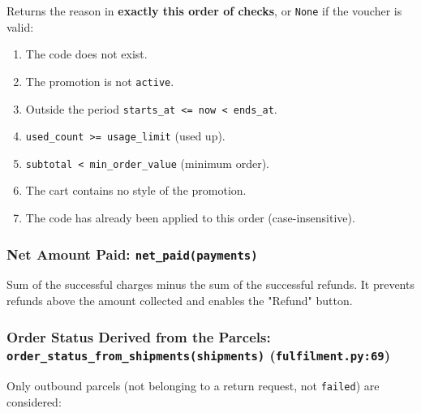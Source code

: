 Returns the reason in \textbf{exactly this order of checks}, or
\texttt{None} if the voucher is valid:

\begin{enumerate}
\def\labelenumi{\arabic{enumi}.}
\tightlist
\item
  The code does not exist.
\item
  The promotion is not \texttt{active}.
\item
  Outside the period
  \texttt{starts\_\allowbreak{}at \textless{}=\allowbreak{} now \textless{} ends\_\allowbreak{}at}.
\item
  \texttt{used\_\allowbreak{}count \textgreater{}\allowbreak{}=\allowbreak{} usage\_\allowbreak{}limit} (used up).
\item
  \texttt{subtotal \textless{} min\_\allowbreak{}order\_\allowbreak{}value} (minimum order).
\item
  The cart contains no style of the promotion.
\item
  The code has already been applied to this order (case-insensitive).
\end{enumerate}

\hypertarget{net-amount-paid-net_paidpayments}{%
\subsubsection{\texorpdfstring{Net Amount Paid:
\texttt{net\_\allowbreak{}paid(\allowbreak{}payments)}}{Net Amount Paid: net\_paid(payments)}}\label{net-amount-paid-net_paidpayments}}

Sum of the successful charges minus the sum of the successful refunds.
It prevents refunds above the amount collected and enables the "Refund"
button.

\hypertarget{order-status-derived-from-the-parcels-order_status_from_shipmentsshipments-fulfilment.py69}{%
\subsubsection{\texorpdfstring{Order Status Derived from the Parcels:
\texttt{order\_\allowbreak{}status\_\allowbreak{}from\_\allowbreak{}shipments(\allowbreak{}shipments)}
(\texttt{fulfilment.\allowbreak{}py:69})}{Order Status Derived from the Parcels: order\_status\_from\_shipments(shipments) (fulfilment.py:69)}}\label{order-status-derived-from-the-parcels-order_status_from_shipmentsshipments-fulfilment.py69}}

Only outbound parcels (not belonging to a return request, not
\texttt{failed}) are considered:

